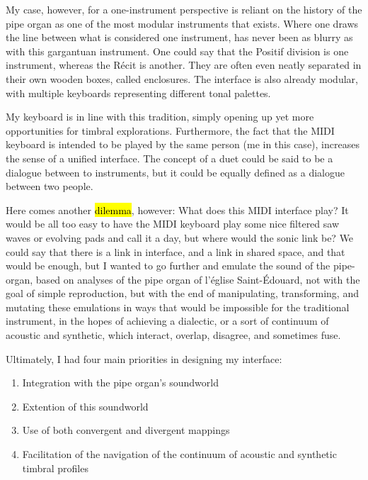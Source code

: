 \documentclass[12pt,twoside,maitrise]{dms_ks}
\theoremstyle{definition}
\begin{document}
{My case, however, for a one-instrument perspective is reliant on the history of the pipe organ as one of the most modular instruments that exists.
Where one draws the line between what is considered one instrument, has never been as blurry as with this gargantuan instrument.
One could say that the Positif division is one instrument, whereas the Récit is another.
They are often even neatly separated in their own wooden boxes, called enclosures.
The interface is also already modular, with multiple keyboards representing different tonal palettes.

My keyboard is in line with this tradition, simply opening up yet more opportunities for timbral explorations.
Furthermore, the fact that the MIDI keyboard is intended to be played by the same person (me in this case), increases the sense of a unified interface.
The concept of a duet could be said to be a dialogue between to instruments, but it could be equally defined as a dialogue between two people.

Here comes another \hl{dilemma}, however: What does this MIDI interface play?
It would be all too easy to have the MIDI keyboard play some nice filtered saw waves or evolving pads and call it a day, but where would the sonic link be?
We could say that there is a link in interface, and a link in shared space, and that would be enough, but I wanted to go further and emulate the sound of the pipe-organ, based on analyses of the pipe organ of l'église Saint-Édouard, not with the goal of simple reproduction, but with the end of manipulating, transforming, and mutating these emulations in ways that would be impossible for the traditional instrument, in the hopes of achieving a dialectic, or a sort of continuum of acoustic and synthetic, which interact, overlap, disagree, and sometimes fuse.


Ultimately, I had four main priorities in designing my interface:

\begin{enumerate}
  \item Integration with the pipe organ's soundworld

  \item Extention of this soundworld
   
  \item Use of both convergent and divergent mappings

  \item Facilitation of the navigation of the continuum of acoustic
and synthetic timbral profiles
\end{enumerate}

}
\end{document}
